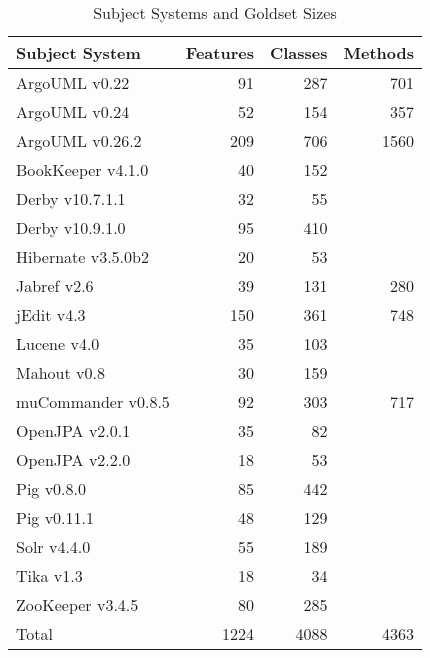 \begin{table}[t]
\renewcommand{\arraystretch}{1.3}
\footnotesize
\centering
\caption{Subject Systems and Goldset Sizes}
\begin{tabular}{lrrr}
    \toprule
    Subject System      & Features  & Classes   & Methods \\
    \midrule
    ArgoUML v0.22 & 91 & 287 & 701 \\
    ArgoUML v0.24 & 52 & 154 & 357 \\
    ArgoUML v0.26.2 & 209 & 706 & 1560 \\
    BookKeeper v4.1.0 & 40 & 152 &   \\
    Derby v10.7.1.1 & 32 & 55 &   \\
    Derby v10.9.1.0 & 95 & 410 &   \\
    Hibernate v3.5.0b2 & 20 & 53 &   \\
    Jabref v2.6 & 39 & 131 & 280 \\
    jEdit v4.3 & 150 & 361 & 748 \\
    Lucene v4.0 & 35 & 103 &   \\
    Mahout v0.8 & 30 & 159 &   \\
    muCommander v0.8.5 & 92 & 303 & 717 \\
    OpenJPA v2.0.1 & 35 & 82 &   \\
    OpenJPA v2.2.0 & 18 & 53 &   \\
    Pig v0.8.0 & 85 & 442 &   \\
    Pig v0.11.1 & 48 & 129 &   \\
    Solr v4.4.0 & 55 & 189 &   \\
    Tika v1.3 & 18 & 34 &   \\
    ZooKeeper v3.4.5 & 80 & 285 &   \\
    \midrule
    Total & 1224 & 4088 & 4363 \\
    \bottomrule
\end{tabular}
\label{table:subjects}
\end{table}

